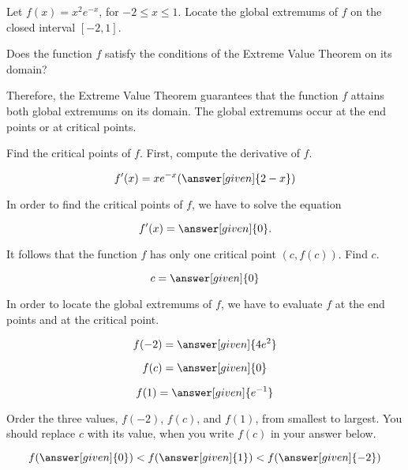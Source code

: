 \documentclass{ximera}
\begin{document}
\begin{question}
Let $f(x)=x^2e^{-x}$,  for $ -2\le x\le1$. Locate the global extremums of $f$ on the closed interval $[-2,1]$.


Does the function $f$ satisfy the conditions of the Extreme Value Theorem on its domain?
 \begin{multipleChoice}
  \end{multipleChoice}
  Therefore, the Extreme Value Theorem guarantees that the function $f$ attains both global extremums on its domain. The global extremums occur at the end points or at  critical points.
  
  Find the critical points of $f$. First, compute the derivative of $f$.
      \begin{prompt}
  \[
 f'(x)= xe^{-x}(\answer[given]{2-x})
  \]
  \end{prompt}
 In order to find the critical points of $f$, we have to solve the equation
 \begin{prompt}
 \[
 f'(x)= \answer[given]{0}.
  \]
  \end{prompt}
It follows that the  function $f$ has only one critical point $\left(c,f(c)\right)$. Find $c$.

  \begin{prompt}
  \[
c= \answer[given]{0}
  \]
  \end{prompt}
In order to locate the global extremums of $f$, we have to evaluate $f$ at the end points and at the critical point.
 \begin{prompt}
  \[
f(-2)= \answer[given]{4e^{2}}
  \]
  \end{prompt}
   \begin{prompt}
  \[
f(c)= \answer[given]{0}
  \]
  \end{prompt}
  
  \begin{prompt}
  \[
f(1)= \answer[given]{e^{-1}}
  \]
  \end{prompt}
   Order the three values, $f(-2)$, $f(c)$, and $f(1)$,  from smallest to largest. You should replace $c$ with its value, when you write $f(c)$  in your answer below.
   \begin{prompt}
  \[
f(\answer[given]{0})<f(\answer[given]{1})<f(\answer[given]{-2})
  \]

  \end{prompt}
 

\end{question}
\end{document}
